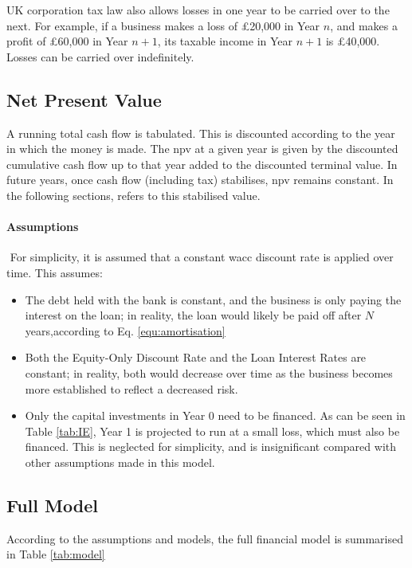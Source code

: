 \documentclass{report_template_oxford}
\begin{document}
\noindent UK corporation tax law also allows losses in one year to be carried over to the next. For example, if a business makes a loss of £20,000 in Year \(n\), and makes a profit of £60,000 in Year \(n+1\), its taxable income in Year \(n+1\) is £40,000. Losses can be carried over indefinitely.

\subsection{Net Present Value}
A running total cash flow is tabulated. This is discounted according to the year in which the money is made. The \gls{npv} at a given year is given by the discounted cumulative cash flow up to that year added to the discounted terminal value. In future years, once cash flow (including tax) stabilises, \gls{npv} remains constant. In the following sections,  refers to this stabilised value.

\paragraph{Assumptions} \(\) \newline
For simplicity, it is assumed that a constant \gls{wacc} discount rate is applied over time. This assumes:
\begin{itemize}
    \item The debt held with the bank is constant, and the business is only paying the interest on the loan; in reality, the loan would likely be paid off after \(N\) years,according to Eq. \ref{equ:amortisation}
    \item Both the Equity-Only Discount Rate and the Loan Interest Rates are constant; in reality, both would decrease over time as the business becomes more established to reflect a decreased risk.
    \item Only the capital investments in Year 0 need to be financed. As can be seen in Table \ref{tab:IE}, Year 1 is projected to run at a small loss, which must also be financed. This is neglected for simplicity, and is insignificant compared with other assumptions made in this model.
\end{itemize}

\subsection{Full Model}
According to the assumptions and models, the full financial model is summarised in Table \ref{tab:model}
\end{document}
